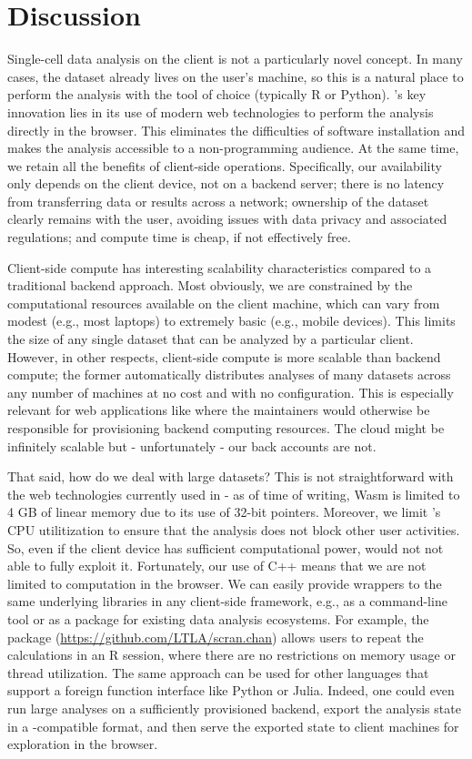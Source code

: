 \documentclass{article}
\begin{document}
\section{Discussion}

Single-cell data analysis on the client is not a particularly novel concept.
In many cases, the dataset already lives on the user's machine, so this is a natural place to perform the analysis with the tool of choice (typically R or Python).
's key innovation lies in its use of modern web technologies to perform the analysis directly in the browser.
This eliminates the difficulties of software installation and makes the analysis accessible to a non-programming audience.
At the same time, we retain all the benefits of client-side operations.
Specifically, our availability only depends on the client device, not on a backend server;
there is no latency from transferring data or results across a network;
ownership of the dataset clearly remains with the user, avoiding issues with data privacy and associated regulations;
and compute time is cheap, if not effectively free.

Client-side compute has interesting scalability characteristics compared to a traditional backend approach.
Most obviously, we are constrained by the computational resources available on the client machine,
which can vary from modest (e.g., most laptops) to extremely basic (e.g., mobile devices).
This limits the size of any single dataset that can be analyzed by a particular client.
However, in other respects, client-side compute is more scalable than backend compute;
the former automatically distributes analyses of many datasets across any number of machines at no cost and with no configuration.
This is especially relevant for web applications like  where the maintainers would otherwise be responsible for provisioning backend computing resources.
The cloud might be infinitely scalable but - unfortunately - our back accounts are not.

That said, how do we deal with large datasets?
This is not straightforward with the web technologies currently used in  - 
as of time of writing, Wasm is limited to 4 GB of linear memory due to its use of 32-bit pointers.
Moreover, we limit 's CPU utilitization to ensure that the analysis does not block other user activities.
So, even if the client device has sufficient computational power,  would not not able to fully exploit it.
Fortunately, our use of C++ means that we are not limited to computation in the browser.
We can easily provide wrappers to the same underlying libraries in any client-side framework, e.g., as a command-line tool or as a package for existing data analysis ecosystems.
For example, the  package (\url{https://github.com/LTLA/scran.chan}) allows users to repeat the  calculations in an R session,
where there are no restrictions on memory usage or thread utilization.
The same approach can be used for other languages that support a foreign function interface like Python or Julia.
Indeed, one could even run large analyses on a sufficiently provisioned backend, 
export the analysis state in a -compatible format,
and then serve the exported state to client machines for exploration in the browser. 



\end{document}
